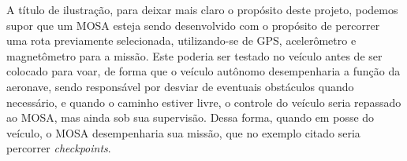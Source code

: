 

A título de ilustração, para deixar mais claro o propósito deste projeto, podemos
supor que um MOSA esteja sendo desenvolvido com o propósito de percorrer uma rota
previamente selecionada, utilizando-se de GPS, acelerômetro e magnetômetro para a
missão. Este poderia ser testado no veículo antes de ser colocado para voar, de forma que
o veículo autônomo desempenharia a função da aeronave, sendo responsável por desviar
de eventuais obstáculos quando necessário, e quando o caminho estiver livre, o controle
do veículo seria repassado ao MOSA, mas ainda sob sua supervisão. Dessa forma, quando
em posse do veículo, o MOSA desempenharia sua missão, que no exemplo citado seria
percorrer \textit{checkpoints}.